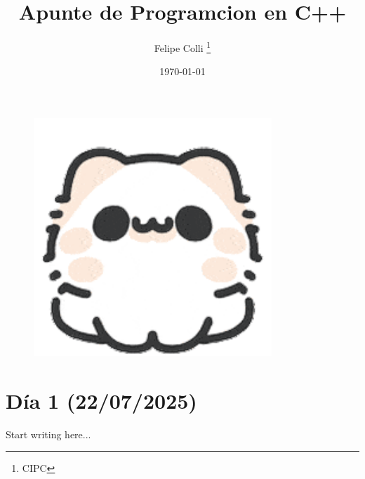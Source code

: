 \documentclass[11pt]{article}
\title{Apunte de Programcion en C++}
\author{Felipe Colli \thanks{CIPC}}
\date{\today}
\begin{document}
\maketitle
\begin{figure}[htbp]
    \centering
    \includegraphics[width=0.8\textwidth]{gatito}
    
\end{figure}

\newpage
\tableofcontents


\newpage
\section{Día 1 (22/07/2025)}
Start writing here...
\end{document}
